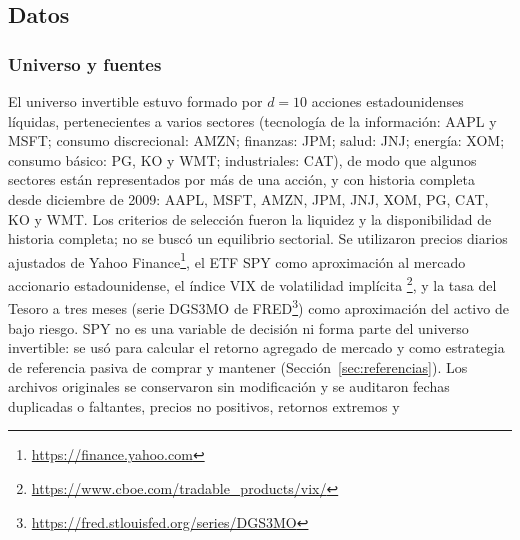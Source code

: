 \subsection{Datos}\label{sec:datos}

\subsubsection{Universo y fuentes}

El universo invertible estuvo formado por $d=10$ acciones estadounidenses líquidas, 
pertenecientes a varios sectores (tecnología de la información: AAPL y MSFT; consumo discrecional: AMZN; finanzas: JPM; salud: JNJ; energía: XOM; consumo básico: PG, KO y WMT; industriales: CAT), de modo que algunos sectores están representados por más de una acción, y con historia completa desde diciembre de 2009: AAPL, MSFT, AMZN, JPM, JNJ, XOM, PG, CAT, KO y WMT. Los criterios de selección fueron la liquidez y la disponibilidad de historia completa; no se buscó un equilibrio sectorial. 
 Se utilizaron precios diarios ajustados de Yahoo Finance\footnote{\url{https://finance.yahoo.com}}, el ETF SPY como aproximación al mercado accionario estadounidense, el índice VIX de volatilidad implícita \citep{whaley2000}\footnote{\url{https://www.cboe.com/tradable_products/vix/}}, y la tasa del Tesoro a tres meses (serie DGS3MO de FRED\footnote{\url{https://fred.stlouisfed.org/series/DGS3MO}}) como aproximación del activo de bajo riesgo. 
SPY no es una variable de decisión ni forma parte del universo invertible: se usó para calcular el retorno agregado de mercado y como estrategia de referencia pasiva de comprar y mantener (Sección~\ref{sec:referencias}).
 Los archivos originales se conservaron sin modificación y se auditaron fechas duplicadas o faltantes, precios no positivos, retornos extremos y 

